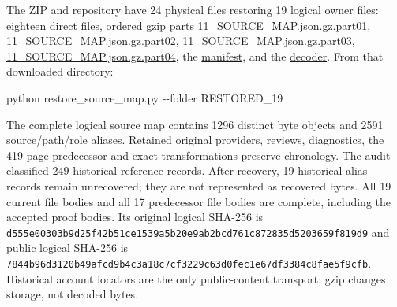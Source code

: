 \documentclass[
]{article}
\newenvironment{Shaded}{}{}
\newcommand{\NormalTok}[1]{#1}
\begin{document}
The ZIP and repository have 24 physical files restoring 19 logical owner
files: eighteen direct files, ordered gzip parts
\href{https://github.com/KokunoYumeto/zeta-function-research-reader/blob/28e540812ca5d45e8943395e460799888b4e5348/workbenches/splitzero-tandem/continuations/20260915-native-conductor-continuation/11_SOURCE_MAP.json.gz.part01}{11\_SOURCE\_MAP.json.gz.part01},
\href{https://github.com/KokunoYumeto/zeta-function-research-reader/blob/28e540812ca5d45e8943395e460799888b4e5348/workbenches/splitzero-tandem/continuations/20260915-native-conductor-continuation/11_SOURCE_MAP.json.gz.part02}{11\_SOURCE\_MAP.json.gz.part02},
\href{https://github.com/KokunoYumeto/zeta-function-research-reader/blob/28e540812ca5d45e8943395e460799888b4e5348/workbenches/splitzero-tandem/continuations/20260915-native-conductor-continuation/11_SOURCE_MAP.json.gz.part03}{11\_SOURCE\_MAP.json.gz.part03},
\href{https://github.com/KokunoYumeto/zeta-function-research-reader/blob/28e540812ca5d45e8943395e460799888b4e5348/workbenches/splitzero-tandem/continuations/20260915-native-conductor-continuation/11_SOURCE_MAP.json.gz.part04}{11\_SOURCE\_MAP.json.gz.part04},
the
\href{https://github.com/KokunoYumeto/zeta-function-research-reader/blob/28e540812ca5d45e8943395e460799888b4e5348/workbenches/splitzero-tandem/continuations/20260915-native-conductor-continuation/SOURCE_MAP_TRANSPORT.json}{manifest},
and the
\href{https://github.com/KokunoYumeto/zeta-function-research-reader/blob/28e540812ca5d45e8943395e460799888b4e5348/workbenches/splitzero-tandem/continuations/20260915-native-conductor-continuation/restore_source_map.py}{decoder}.
From that downloaded directory:

\begin{Shaded}
\begin{Highlighting}[]
\NormalTok{python restore\_source\_map.py {-}{-}folder RESTORED\_19}
\end{Highlighting}
\end{Shaded}

The complete logical source map contains 1296 distinct byte objects and
2591 source/path/role aliases. Retained original providers, reviews,
diagnostics, the 419-page predecessor and exact transformations preserve
chronology. The audit classified 249 historical-reference records. After
recovery, 19 historical alias records remain unrecovered; they are not
represented as recovered bytes. All 19 current file bodies and all 17
predecessor file bodies are complete, including the accepted proof
bodies. Its original logical SHA-256 is
\texttt{d555e00303b9d25f42b51ce1539a5b20e9ab2bcd761c872835d5203659f819d9}
and public logical SHA-256 is
\texttt{7844b96d3120b49afcd9b4c3a18c7cf3229c63d0fec1e67df3384c8fae5f9cfb}.
Historical account locators are the only public-content transport; gzip
changes storage, not decoded bytes.
\end{document}
